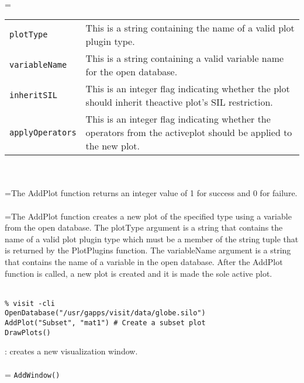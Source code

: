 \documentclass[10pt,a4paper]{report}
\begin{document}
 \\ 
\hangindent=\parindent 
\begin{tabular}{lp{9cm}}
\verb!plotType! & This is a string containing the name of a valid plot plugin type. \\
\verb!variableName ! & This is a string containing a valid variable name for the open database. \\
\verb!inheritSIL! & This is an integer flag indicating whether the plot should inherit theactive plot's SIL restriction. \\
\verb!applyOperators! & This is an integer flag indicating whether the operators from the activeplot should be applied to the new plot. \\
\end{tabular} \\[-2mm]


 \\ 
\hangindent=\parindent The AddPlot function returns an integer value of 1 for success and 0 for failure. \\[-3mm] 

 \\ 
\hangindent=\parindent The AddPlot function creates a new plot of the specified type using a variable from the open database. The plotType argument is a string that contains the name of a valid plot plugin type which must be a member of the string tuple that is returned by the PlotPlugins function. The variableName argument is a string that contains the name of a variable in the open database. After the AddPlot function is called, a new plot is created and it is made the sole active plot. \\[-3mm] 

\\[-6mm]
\begin{verbatim}% visit -cli
OpenDatabase("/usr/gapps/visit/data/globe.silo")
AddPlot("Subset", "mat1") # Create a subset plot
DrawPlots()
\end{verbatim}
\newpage


{}
: creates a new visualization window.\\[-3mm]

 \\ 
\hangindent=\parindent 
\verb!AddWindow()!\\ [-3mm]
\end{document}
